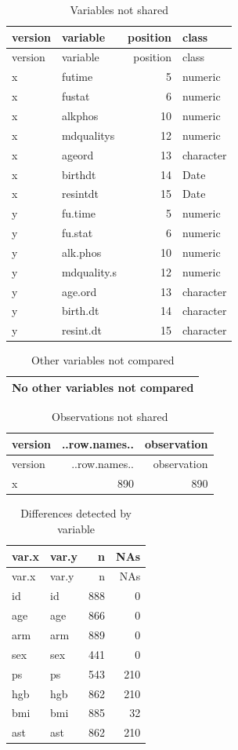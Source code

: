 \documentclass[
]{book}
\begin{document}
\begin{longtable}[]{@{}llrl@{}}
\caption{\label{tab:unnamed-chunk-28}Variables not shared}\tabularnewline
\toprule
version & variable & position & class\tabularnewline
\midrule
\endfirsthead
\toprule
version & variable & position & class\tabularnewline
\midrule
\endhead
x & futime & 5 & numeric\tabularnewline
x & fustat & 6 & numeric\tabularnewline
x & alkphos & 10 & numeric\tabularnewline
x & mdqualitys & 12 & numeric\tabularnewline
x & ageord & 13 & character\tabularnewline
x & birthdt & 14 & Date\tabularnewline
x & resintdt & 15 & Date\tabularnewline
y & fu.time & 5 & numeric\tabularnewline
y & fu.stat & 6 & numeric\tabularnewline
y & alk.phos & 10 & numeric\tabularnewline
y & mdquality.s & 12 & numeric\tabularnewline
y & age.ord & 13 & character\tabularnewline
y & birth.dt & 14 & character\tabularnewline
y & resint.dt & 15 & character\tabularnewline
\bottomrule
\end{longtable}

\begin{longtable}[]{@{}l@{}}
\caption{\label{tab:unnamed-chunk-28}Other variables not compared}\tabularnewline
\toprule
\endhead
No other variables not compared\tabularnewline
\bottomrule
\end{longtable}

\begin{longtable}[]{@{}lrr@{}}
\caption{\label{tab:unnamed-chunk-28}Observations not shared}\tabularnewline
\toprule
version & ..row.names.. & observation\tabularnewline
\midrule
\endfirsthead
\toprule
version & ..row.names.. & observation\tabularnewline
\midrule
\endhead
x & 890 & 890\tabularnewline
\bottomrule
\end{longtable}

\begin{longtable}[]{@{}llrr@{}}
\caption{\label{tab:unnamed-chunk-28}Differences detected by variable}\tabularnewline
\toprule
var.x & var.y & n & NAs\tabularnewline
\midrule
\endfirsthead
\toprule
var.x & var.y & n & NAs\tabularnewline
\midrule
\endhead
id & id & 888 & 0\tabularnewline
age & age & 866 & 0\tabularnewline
arm & arm & 889 & 0\tabularnewline
sex & sex & 441 & 0\tabularnewline
ps & ps & 543 & 210\tabularnewline
hgb & hgb & 862 & 210\tabularnewline
bmi & bmi & 885 & 32\tabularnewline
ast & ast & 862 & 210\tabularnewline
\bottomrule
\end{longtable}
\end{document}
